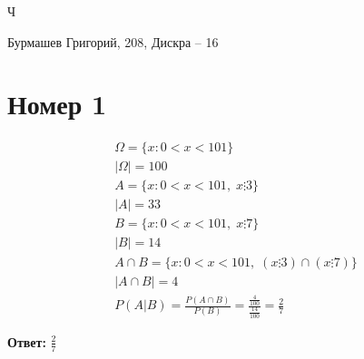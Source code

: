 Ч%

\usepackage{cmap}					%
\usepackage{mathtext} 				%
\usepackage[T2A]{fontenc}			%
\usepackage[utf8]{inputenc}			%
\usepackage[english,russian]{babel}	%
\usepackage{xcolor}
\usepackage{hyperref}

\hypersetup{pdfstartview=FitH,  linkcolor=linkcolor,urlcolor=urlcolor, colorlinks=true}

\usepackage{amsfonts,amssymb,amsthm,mathtools} %
\usepackage{amsmath}
\usepackage{icomma} %


\usepackage{euscript}	 %
\usepackage{mathrsfs} %

\DeclareMathOperator{\sgn}{\mathop{sgn}}

\newcommand*{\hm}[1]{#1\nobreak\discretionary{}
{\hbox{$\mathsurround=0pt #1$}}{}}
\usepackage{graphicx}
\graphicspath{{pictures/}}
\author{Бурмашев Григорий, БПМИ-208}
\title{}
\date{\today}

\begin{center}
Бурмашев Григорий, 208, Дискра -- 16
\end{center}
\section*{Номер 1}
\begin{equation*}
\begin{gathered}
\Omega = \{x : 0 < x < 101\} \\
|\Omega| = 100 \\
A = \{x : 0 < x < 101, \;x \vdots 3\} \\
|A| = 33 \\
B = \{x : 0 < x < 101, \; x \vdots 7\} \\
|B| = 14\\
A \cap B = \{x : 0 < x < 101, \; (x \vdots 3) \cap (x \vdots 7)\} \\
|A \cap B| = 4 \\
P(A|B) = \frac{P(A\cap B)}{P(B)} = \frac{\frac{4}{100}}{\frac{14}{100}} = \frac{2}{7}
\end{gathered}
\end{equation*}
\begin{center}
\textbf{Ответ: } $\frac{2}{7}$
\end{center}
